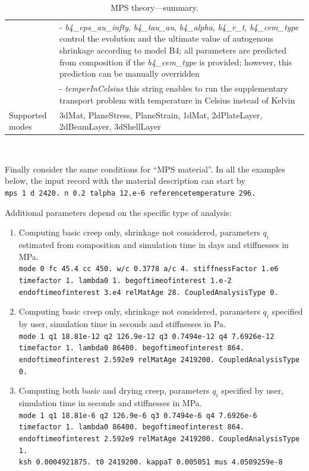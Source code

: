 \documentclass[a4paper]{article}
\newcommand{\param}[1]{{\it #1}}
\newenvironment{mmt}{\begin{tabular}{|l|p{9cm}|}}{\end{tabular}\\}
\newenvironment{mmt}{\begin{tabular}{|l|l|}}{\end{tabular}\\}
\begin{document}
\begin{table}[!htb]
\begin{mmt}
&- \param{b4\_eps\_au\_infty}, \param{b4\_tau\_au}, \param{b4\_alpha}, \param{b4\_r\_t}, \param{b4\_cem\_type} control the evolution and the ultimate value of autogenous shrinkage according to model B4; all parameters are predicted from composition if the \param{b4\_cem\_type} is provided; however, this prediction can be manually overridden\\
&- \param{temperInCelsius} this string enables to run the supplementary transport problem with temperature in Celsius instead of Kelvin \\
%
Supported modes& 3dMat, PlaneStress, PlaneStrain, 1dMat,
2dPlateLayer, 2dBeamLayer, 3dShellLayer\\
\hline
\end{mmt}

\caption{MPS theory---summary.}
\label{mps_table}

\end{table}


Finally consider the same conditions for ``MPS material''.
In all the examples below,
the input record with the material description can start by\\
{\tt mps 1 d 2420. n 0.2 talpha 12.e-6 referencetemperature 296.}


Additional parameters
depend on the specific type of analysis:
\begin{enumerate}
\item
Computing basic creep only, shrinkage not considered,
parameters $q_i$ estimated from composition and simulation time in
days and stiffnesses in MPa.\\
{\tt mode 0 fc 45.4 cc 450. w/c 0.3778 a/c 4. stiffnessFactor 1.e6\\
  timefactor 1. lambda0 1. begoftimeofinterest 1.e-2 \\
endoftimeofinterest 3.e4  relMatAge 28.  CoupledAnalysisType 0.} 

\item
Computing basic creep only, shrinkage not considered,
parameters $q_i$ specified by user, simulation time in seconds and stiffnesses in Pa.\\
{\tt mode 1 q1 18.81e-12 q2 126.9e-12 q3 0.7494e-12 q4 7.6926e-12 \\
 timefactor 1. lambda0 86400. begoftimeofinterest 864.\\
 endoftimeofinterest 2.592e9 relMatAge 2419200. CoupledAnalysisType 0.} 

\item
Computing both basic and drying creep, 
parameters $q_i$ specified by user, simulation time in seconds and stiffnesses in MPa.\\
{\tt mode 1 q1 18.81e-6 q2 126.9e-6 q3 0.7494e-6 q4 7.6926e-6\\ 
  timefactor 1. lambda0 86400. begoftimeofinterest 864.\\ 
endoftimeofinterest 2.592e9  relMatAge 2419200. CoupledAnalysisType
1. \\
ksh 0.0004921875. t0 2419200. kappaT 0.005051 mus 4.0509259e-8} 


\end{enumerate}
\end{document}
